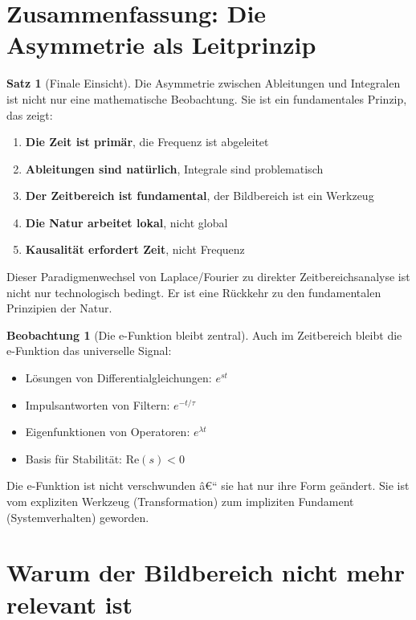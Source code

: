 ﻿\documentclass[a4paper,12pt]{report}
\theoremstyle{definition}
\newtheorem{satz}{Satz}
\newtheorem{beobachtung}{Beobachtung}
\begin{document}
	\section{Zusammenfassung: Die Asymmetrie als Leitprinzip}
	
	\begin{satz}[Finale Einsicht]
		Die Asymmetrie zwischen Ableitungen und Integralen ist nicht nur eine mathematische Beobachtung. Sie ist ein fundamentales Prinzip, das zeigt:
		
		\begin{enumerate}
			\item[-] \textbf{Die Zeit ist primär}, die Frequenz ist abgeleitet
			\item[-] \textbf{Ableitungen sind natürlich}, Integrale sind problematisch
			\item[-] \textbf{Der Zeitbereich ist fundamental}, der Bildbereich ist ein Werkzeug
			\item[-] \textbf{Die Natur arbeitet lokal}, nicht global
			\item[-] \textbf{Kausalität erfordert Zeit}, nicht Frequenz
		\end{enumerate}
		
		Dieser Paradigmenwechsel von Laplace/Fourier zu direkter Zeitbereichsanalyse ist nicht nur technologisch bedingt. Er ist eine Rückkehr zu den fundamentalen Prinzipien der Natur.
	\end{satz}
	
	\begin{beobachtung}[Die e-Funktion bleibt zentral]
		Auch im Zeitbereich bleibt die e-Funktion das universelle Signal:
		\begin{itemize}
			\item[-] Lösungen von Differentialgleichungen: $e^{st}$
			\item[-] Impulsantworten von Filtern: $e^{-t/\tau}$
			\item[-] Eigenfunktionen von Operatoren: $e^{\lambda t}$
			\item[-] Basis für Stabilität: $\text{Re}(s) < 0$
		\end{itemize}
		
		Die e-Funktion ist nicht verschwunden â€“ sie hat nur ihre Form geändert. Sie ist vom expliziten Werkzeug (Transformation) zum impliziten Fundament (Systemverhalten) geworden.
	\end{beobachtung}
	
	\section{Warum der Bildbereich nicht mehr relevant ist}
	
\end{document}
